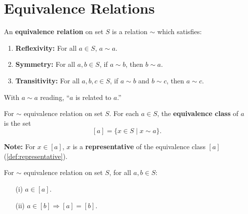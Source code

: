 \section{Equivalence Relations}

\begin{Def}

    An \textbf{equivalence relation} on set $S$ is a relation $\sim$ which satisfies:
    \begin{enumerate}
        \item \textbf{Reflexivity:} For all $a \in S$, $a \sim a$.
        \item \textbf{Symmetry:} For all $a, b \in S$, if $a \sim b$, then $b \sim a$.
        \item \textbf{Transitivity:} For all $a, b, c \in S$, if $a \sim b$ and $b \sim c$, then $a \sim c$.
    \end{enumerate}
    With $a\sim a$ reading, ``$a$ is related to $a$.''
\end{Def}


\begin{Def}

    \label{def:equiv_class}

    For $\sim$ equivalence relation on set $S$. For each $a \in S$, the \textbf{equivalence class} of $a$ is the set
    \[
        [a] = \{x \in S \mid x \sim a\}.
    \]
\end{Def}

\begin{Note}
    \textbf{Note:} For $x\in[a]$, $x$ is a \textbf{representative} of the equivalence class $[a]$ (\ref{def:representative}).
\end{Note}

\begin{theo}

    For $\sim$ equivalence relation on set $S$, for all $a, b \in S$:

    \begin{itemize}
        \item[(i)]  $a \in [a]$.
        \item[(ii)] $a \in [b] \Longrightarrow [a] = [b]$.
    \end{itemize}
    
\end{theo}

\newpage

